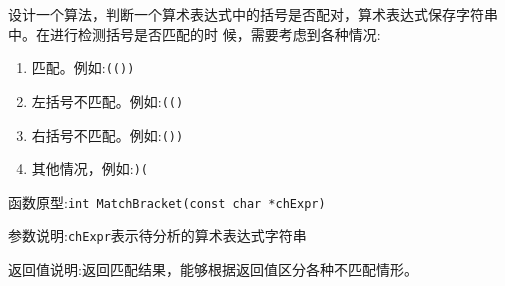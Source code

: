 ﻿\documentclass  [11pt,twocolumn]{article}
\begin{document}
设计一个算法，判断一个算术表达式中的括号是否配对，算术表达式保存字符串中。在进行检测括号是否匹配的时
候，需要考虑到各种情况:

\begin{enumerate}
\item 匹配。例如:\lstinline$(())$
\item 左括号不匹配。例如:\lstinline$(()$
\item 右括号不匹配。例如:\lstinline$())$
\item 其他情况，例如:\lstinline$)($
\end{enumerate}

函数原型:\lstinline$int MatchBracket(const char *chExpr)$

参数说明:\lstinline$chExpr$表示待分析的算术表达式字符串

返回值说明:返回匹配结果，能够根据返回值区分各种不匹配情形。
\end{document}
